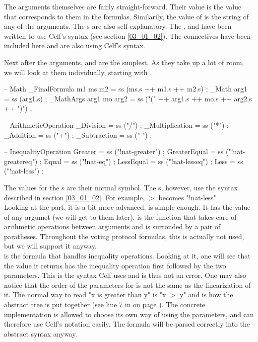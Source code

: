 The arguments themselves are fairly straight-forward. Their value is the value that corresponds to them in the formulas. Similarily, the value of  is the string of any of the arguments. The s are also self-explanatory. The ,  and  have been written to use Celf's syntax (see section \ref{03_01_02}). The connectives have been included here and are also using Celf's syntax.

Next after the arguments,  and  are the simplest. As they take up a lot of room, we will look at them individually, starting with .
\begin{lstgf}
        -- Math
        _FinalFormula m1 ms m2          = ss (ms.s ++ m1.s ++ m2.s) ;
        _Math arg1                      = ss (arg1.s) ;
        _MathArgs arg1 mo arg2          = ss ("(" ++ arg1.s ++ mo.s ++ arg2.s ++ ")") ;

        -- ArithmeticOperation
        _Division                       = ss ("/") ;
        _Multiplication                 = ss ("*") ;
        _Addition                       = ss ("+") ;
        _Subtraction                    = ss ("-") ;

        -- InequalityOperation
        Greater                         = ss ("!nat-greater") ;
        GreaterEqual                    = ss ("!nat-greatereq") ;
        Equal                           = ss ("!nat-eq") ;
        LessEqual                       = ss ("!nat-lesseq") ;
        Less                            = ss ("!nat-less") ;
\end{lstgf}
The values for the s are their normal symbol. The s, however, use the syntax described in section \ref{03_01_02}. For example, $>$ becomes "!nat-less". \\
Looking at the  part, it is a bit more advanced.  is simple enough. It has the value of any argumet (we will get to them later).  is the function that takes care of arithmetic operations between arguments and is surronded by a pair of paratheses. Throughout the voting protocol formulas, this is actually not used, but we will support it anyway. \\
 is the formula that handles inequality operations. Looking at it, one will see that the value it returns has the inequality operation first followed by the two parameters. This is the syntax Celf uses and is thus not an error. One may also notice that the order of the parameters for  is not the same as the linearization of it. The normal way to read "x is greater than y" is "x $>$ y" and is how the abstract tree is put together (see line 7 in  on page \pageref{code:04_01_C04}). The concrete implementation is allowed to choose its own way of using the parameters, and can therefore use Celf's notation easily. The formula will be parsed correctly into the abstract syntax anyway.

